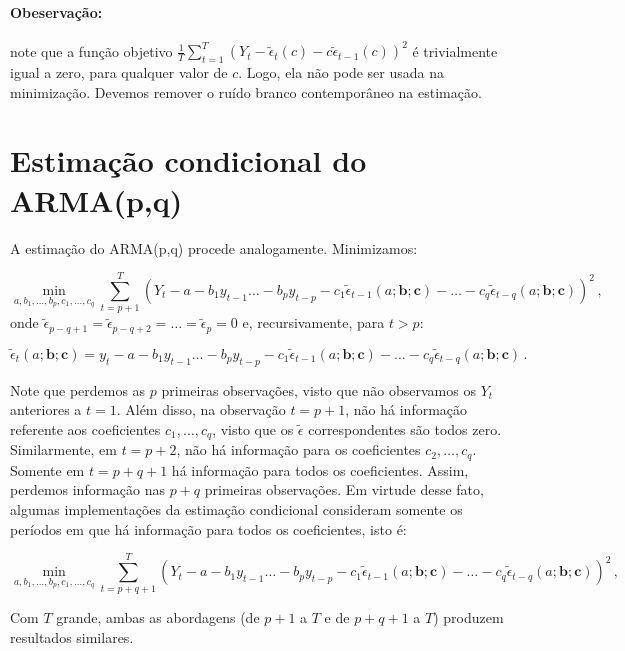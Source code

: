 \documentclass[10pt,a4paper]{article}
\begin{document}
\paragraph{Obeservação:} note que a função objetivo $\frac{1}{T}\sum_{t=1}^T (Y_t - \tilde \epsilon_{t}(c) - c \tilde \epsilon_{t-1}(c))^2$ é trivialmente igual a zero, para qualquer valor de $c$. Logo, ela não pode ser usada na minimização. Devemos remover o ruído branco contemporâneo na estimação.

\section*{Estimação condicional do ARMA(p,q)}

A estimação do ARMA(p,q) procede analogamente. Minimizamos:

$$\operatorname{min}_{a, b_1, \ldots, b_p, c_1,\ldots, c_q} \sum_{t=p+1}^T (Y_t- a - b_1 y_{t-1}\ldots -b_py_{t-p}  - c_1 \tilde{\epsilon}_{t-1}(a;\boldsymbol{b};\boldsymbol{c})- \ldots -c_q \tilde{\epsilon}_{t-q}(a;\boldsymbol{b};\boldsymbol{c}))^2\,,$$ 
onde $\tilde{\epsilon}_{p-q+1} = \tilde{\epsilon}_{p-q+2}=\ldots = \tilde{\epsilon}_{p} = 0$ e, recursivamente, para $t > p$:

$$\tilde{\epsilon}_{t}(a;\boldsymbol{b};\boldsymbol{c}) = y_t- a - b_1 y_{t-1}\ldots -b_py_{t-p}  - c_1 \tilde{\epsilon}_{t-1}(a;\boldsymbol{b};\boldsymbol{c})- \ldots -c_q \tilde{\epsilon}_{t-q}(a;\boldsymbol{b};\boldsymbol{c}) \, .$$

Note que perdemos as $p$ primeiras observações, visto que não observamos os $Y_t$ anteriores a $t=1$. Além disso, na observação $t= p+1$, não há informação referente aos coeficientes $c_1,\ldots, c_q$, visto que os $\tilde \epsilon$ correspondentes são todos zero. Similarmente, em $t=p+2$, não há informação para os coeficientes $c_{2},\ldots, c_q$. Somente em $t=p+q+1$ há informação para todos os coeficientes. Assim, perdemos informação nas $p+q$ primeiras observações. Em virtude desse fato, algumas implementações da estimação condicional consideram somente os períodos em que há informação para todos os coeficientes, isto é: 

$$\operatorname{min}_{a, b_1, \ldots, b_p, c_1,\ldots, c_q} \sum_{t=p+q+1}^T (Y_t- a - b_1 y_{t-1}\ldots -b_py_{t-p}  - c_1 \tilde{\epsilon}_{t-1}(a;\boldsymbol{b};\boldsymbol{c})- \ldots -c_q \tilde{\epsilon}_{t-q}(a;\boldsymbol{b};\boldsymbol{c}))^2\,,$$ 

Com $T$ grande, ambas as abordagens (de $p+1$ a $T$ e de $p+q+1$ a $T$) produzem resultados similares.
\appendix 
\end{document}
